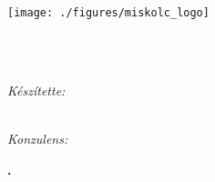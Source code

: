 \documentclass[11pt, a4paper, oneside]{Thesis} %
\begin{document}

\begin{titlepage}
\begin{flushleft}
\Large{
\univname\\
\instname\\
\deptname
}
\end{flushleft}
\begin{center}


\vspace{1cm}

\texttt{[image: ./figures/miskolc\_logo]}

\vspace{1cm}

{\huge \bfseries \ttitle}\\[0.4cm] %

\textsc{\Large \degreename}\\[0.5cm] %
 
 \vspace{4cm}

\textit{Készítette:}\\
\authornames\\
\textsc{\authorId}
 
\vspace{2cm}

\textit{Konzulens:}\\
\supname

\vspace{2cm}

\textbf{\the\year.}
 
\vfill
\end{center}

\end{titlepage}

\clearpage %

\tableofcontents
\newpage










\appendix

%
\end{document}
